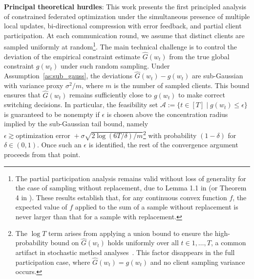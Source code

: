 \documentclass{article} %
\begin{document}
\noindent \textbf{Principal theoretical hurdles}: 
This work presents the first principled analysis of constrained federated optimization under the simultaneous presence of multiple local updates, bi-directional compression with error feedback, and partial client participation. At each communication round, we assume that distinct clients are sampled uniformly at random\footnote{The partial participation analysis remains valid without loss of generality for the case of sampling without replacement, due to Lemma 1.1 in \citet{bardenet2015concentration} (or Theorem 4 in \citet{hoeffding1963probability}). These results establish that, for any continuous convex function \(f\), the expected value of \(f\) applied to the sum of a sample without replacement is never larger than that for a sample with replacement.}.
The main technical challenge is to control the deviation of the empirical constraint estimate
$
\hat{G}(w_t)
$
from the true global constraint
$
g(w_t)
$
under such random sampling.  
Under Assumption~\ref{as:sub_gauss}, the deviations $\hat{G}(w_t) - g(w_t)$ are sub-Gaussian with variance proxy $\sigma^2/m$, where $m$ is the number of sampled clients. This bound ensures that $\hat{G}(w_t)$ remains sufficiently close to $g(w_t)$ to make correct switching decisions. In particular, the feasibility set
$
\mathcal{A} := \{ t \in [T] \mid g(w_t) \leq \epsilon \}
$
is guaranteed to be nonempty if $\epsilon$ is chosen above the concentration radius implied by the sub-Gaussian tail bound, namely
$
\epsilon \gtrsim \text{optimization error } +  \sigma \sqrt{{2 \log(6T/\delta)}/{m}}
$\footnote{The $\log T$ term arises from applying a union bound to ensure the high-probability bound on $\hat{G}(w_t)$ holds uniformly over all $t \in {1,\dots,T}$, a common artifact in stochastic method analyses~\citep{lan2020algorithms}. This factor disappears in the full participation case, where $\hat{G}(w_t)=g(w_t)$ and no client sampling variance occurs.}
with probability $(1-\delta)$ for $\delta \in (0,1)$. Once such an $\epsilon$ is identified, the rest of the convergence argument proceeds from that point.

\end{document}
